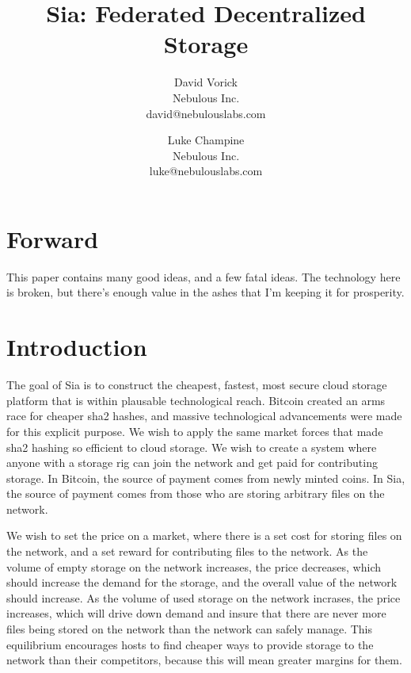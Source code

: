\documentclass[twocolumn]{article}
\begin{document}
\frenchspacing

\title{Sia: Federated Decentralized Storage}

\author{
{\rm David Vorick}\\
Nebulous Inc.\\
david@nebulouslabs.com
\and
{\rm Luke Champine}\\
Nebulous Inc. \\
luke@nebulouslabs.com
}

\maketitle

\section{Forward}
This paper contains many good ideas, and a few fatal ideas.
The technology here is broken, but there's enough value in the ashes that I'm keeping it for prosperity.

\section{Introduction}
The goal of Sia is to construct the cheapest, fastest, most secure cloud storage platform that is within plausable technological reach.
Bitcoin created an arms race for cheaper sha2 hashes, and massive technological advancements were made for this explicit purpose.
We wish to apply the same market forces that made sha2 hashing so efficient to cloud storage.
We wish to create a system where anyone with a storage rig can join the network and get paid for contributing storage.
In Bitcoin, the source of payment comes from newly minted coins.
In Sia, the source of payment comes from those who are storing arbitrary files on the network.

We wish to set the price on a market, where there is a set cost for storing files on the network, and a set reward for contributing files to the network.
As the volume of empty storage on the network increases, the price decreases, which should increase the demand for the storage, and the overall value of the network should increase.
As the volume of used storage on the network incrases, the price increases, which will drive down demand and insure that there are never more files being stored on the network than the network can safely manage.
This equilibrium encourages hosts to find cheaper ways to provide storage to the network than their competitors, because this will mean greater margins for them.
\end{document}
